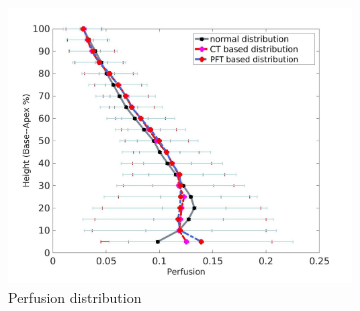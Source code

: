 \begin{figure}[htbp]
\begin{subfigure}{.6\linewidth}
  \includegraphics[width=\linewidth,trim={{.0\wd0} {.0\wd0} {.0\wd0} {.0\wd0}},clip]{ModelBasedAnalysis/Image/PerfusionAgainstLungHeight.jpg}
  \caption{Perfusion distribution}
  \label{fig:MainVQDistribution-b}
\end{subfigure}
\begin{subfigure}{.6\linewidth}%

\end{subfigure}
\end{figure}
